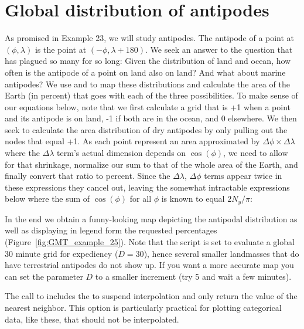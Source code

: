 \section{Global distribution of antipodes}

As promised in Example 23, we will study antipodes.  The antipode of a point at
$(\phi, \lambda)$ is the point at $(-\phi, \lambda + 180)$.  We seek an answer
to the question that has plagued so many for so long: Given the distribution of
land and ocean, how often is the antipode of a point on land also on land? And
what about marine antipodes?  We use  and 
to map these distributions and calculate the area of the Earth (in percent)
that goes with each of the three possibilities.  To make sense of our 
equations below, note that we first calculate a grid that is +1 when a point and its
antipode is on land, -1 if both are in the ocean, and 0 elsewhere.  We then
seek to calculate the area distribution of dry antipodes by only pulling out the nodes
that equal +1.  As each point represent an area approximated by $\Delta \phi \times \Delta \lambda$
where the $\Delta \lambda$ term's actual dimension depends on $\cos (\phi)$, we need
to allow for that shrinkage, normalize our sum to that of the whole area of the Earth,
and finally convert that ratio to percent.  Since the $\Delta \lambda$, $\Delta \phi$ terms
appear twice in these expressions they cancel out, leaving the somewhat
intractable expressions below where the sum of $\cos (\phi)$ for all $\phi$ is known to equal $2N_y / \pi$:


In the end we obtain a funny-looking map depicting the antipodal distribution as
well as displaying in legend form the requested percentages (Figure~\ref{fig:GMT_example_25}).
Note that the script is set to evaluate a global 30 minute grid for expediency ($D = 30$), hence
several smaller landmasses that do have terrestrial antipodes do not show up.  If you want
a more accurate map you can set the parameter $D$ to a smaller increment (try 5 and wait a
few minutes).

The call to  includes the  to suspend interpolation and only
return the value of the nearest neighbor. This option is particularly practical for plotting
categorical data, like these, that should not be interpolated.


